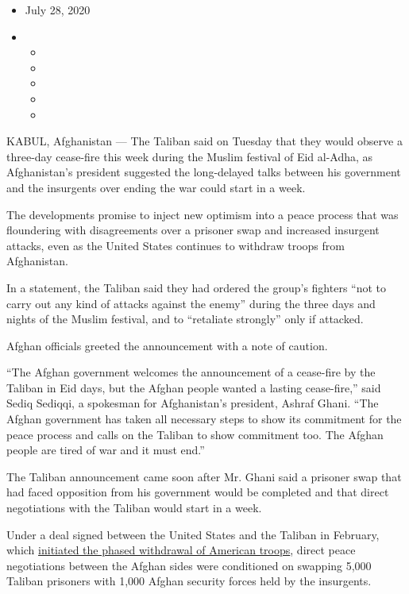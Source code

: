 \begin{itemize}
\item
  July 28, 2020
\item
  \begin{itemize}
  \item
  \item
  \item
  \item
  \item
  \end{itemize}
\end{itemize}

KABUL, Afghanistan --- The Taliban said on Tuesday that they would
observe a three-day cease-fire this week during the Muslim festival of
Eid al-Adha, as Afghanistan's president suggested the long-delayed talks
between his government and the insurgents over ending the war could
start in a week.

The developments promise to inject new optimism into a peace process
that was floundering with disagreements over a prisoner swap and
increased insurgent attacks, even as the United States continues to
withdraw troops from Afghanistan.

In a statement, the Taliban said they had ordered the group's fighters
``not to carry out any kind of attacks against the enemy'' during the
three days and nights of the Muslim festival, and to ``retaliate
strongly'' only if attacked.

Afghan officials greeted the announcement with a note of caution.

``The Afghan government welcomes the announcement of a cease-fire by the
Taliban in Eid days, but the Afghan people wanted a lasting
cease-fire,'' said Sediq Sediqqi, a spokesman for Afghanistan's
president, Ashraf Ghani. ``The Afghan government has taken all necessary
steps to show its commitment for the peace process and calls on the
Taliban to show commitment too. The Afghan people are tired of war and
it must end.''

The Taliban announcement came soon after Mr. Ghani said a prisoner swap
that had faced opposition from his government would be completed and
that direct negotiations with the Taliban would start in a week.

Under a deal signed between the United States and the Taliban in
February, which
\href{https://www.nytimes.com/2020/06/19/world/asia/afghanistan-us-troop-withdrawal.html}{initiated
the phased withdrawal of American troops}, direct peace negotiations
between the Afghan sides were conditioned on swapping 5,000 Taliban
prisoners with 1,000 Afghan security forces held by the insurgents.

